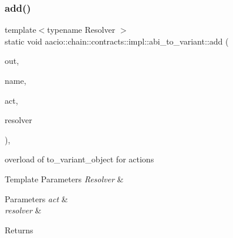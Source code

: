 \subsubsection{\texorpdfstring{add()}{add()}\hspace{0.1cm}{\footnotesize\ttfamily [4/5]}}
{\footnotesize\ttfamily template$<$typename Resolver $>$ \\
static void aacio\+::chain\+::contracts\+::impl\+::abi\+\_\+to\+\_\+variant\+::add (\begin{DoxyParamCaption}\item[{\mbox{\hyperlink{classfc_1_1mutable__variant__object}{mutable\+\_\+variant\+\_\+object}} \&}]{out,  }\item[{const char $\ast$}]{name,  }\item[{const \mbox{\hyperlink{structaacio_1_1chain_1_1action}{action}} \&}]{act,  }\item[{Resolver}]{resolver }\end{DoxyParamCaption})\hspace{0.3cm}{\ttfamily [inline]}, {\ttfamily [static]}}

overload of to\+\_\+variant\+\_\+object for actions 
\begin{DoxyTemplParams}{Template Parameters}
{\em Resolver} & \\
\hline
\end{DoxyTemplParams}

\begin{DoxyParams}{Parameters}
{\em act} & \\
\hline
{\em resolver} & \\
\hline
\end{DoxyParams}
\begin{DoxyReturn}{Returns}

\end{DoxyReturn}
\mbox{\label{structaacio_1_1chain_1_1contracts_1_1impl_1_1abi__to__variant_abd5e736958193540eb91fc05c991509d}} 

